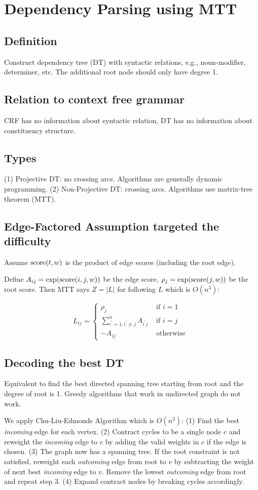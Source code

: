 \section{Dependency Parsing using MTT}

\subsection*{Definition} Construct dependency tree (DT) with syntactic relations, e.g., noun-modifier, determiner, etc. The additional root node should only have degree 1.

\subsection*{Relation to context free grammar}
CRF has no information about syntactic relation, DT has no information about constituency structure.

\subsection*{Types} 
(1) Projective DT: no crossing arcs. Algorithms are generally dynamic programming.
(2) Non-Projective DT: crossing arcs. Algorithms use matrix-tree theorem (MTT).


\subsection*{Edge-Factored Assumption targeted the difficulty}
Assume $\text{score}(t,w)$ is the product of edge scores (including the root edge).

Define $A_{ij}=\exp(\text{score}(i,j,w))$ be the edge score, $\rho_j = \exp(\text{score}(j,w))$ be the root score. Then MTT says $Z=|L|$ for following $L$ which is $O(n^3)$:

$$
L_{i j}= \begin{cases}\rho_{j} & \text { if } i=1 \\ \sum_{i^{\prime}=1, i^{\prime} \neq j}^{n} A_{i^{\prime} j} & \text { if } i=j \\ -A_{i j} & \text { otherwise }\end{cases}
$$

\subsection*{Decoding the best DT}
Equivalent to find the best directed spanning tree starting from root and the degree of root is 1. Greedy algorithms that work in undirected graph do not work.

We apply Chu-Liu-Edmonds Algorithm which is $O(n^3)$:
(1) Find the best \emph{incoming} edge for each vertex. 
(2) Contract cycles to be a single node $c$ and reweight the \emph{incoming} edge to $c$ by adding the valid weights in $c$ if the edge is chosen. 
(3) The graph now has a spanning tree. If the root constraint is not satisfied, reweight each \emph{outcoming} edge from root to $v$ by subtracting the weight of next best \emph{incoming} edge to $v$. Remove the lowest \emph{outcoming} edge from root and repeat step 3. 
(4) Expand contract nodes by breaking cycles accordingly.